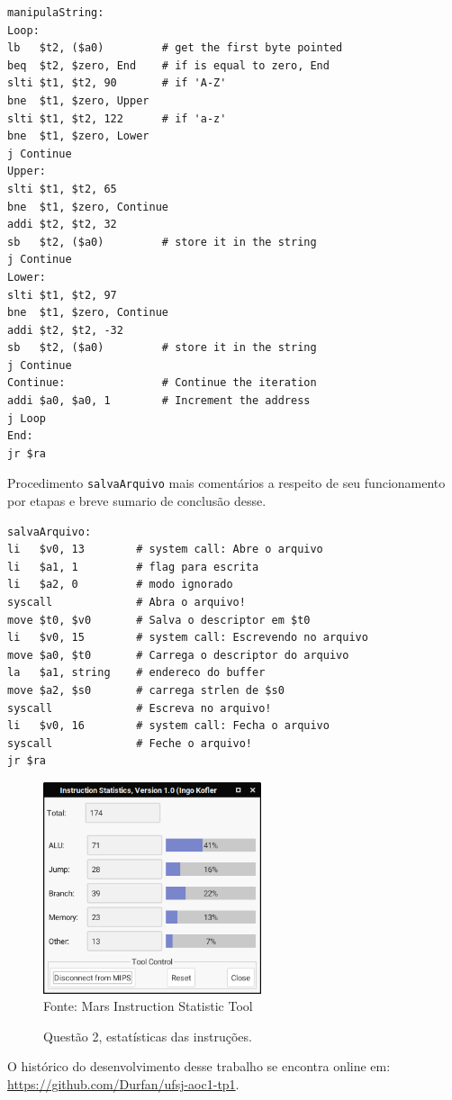 \documentclass[12pt,a4paper]{article}
\numberwithin{figure}{section}
\numberwithin{table}{section}
\begin{document}
\vspace{-0.5cm}
\begin{lstlisting}[caption={manipulaString}]
manipulaString:
Loop:  
lb   $t2, ($a0)         # get the first byte pointed
beq  $t2, $zero, End    # if is equal to zero, End
slti $t1, $t2, 90       # if 'A-Z'
bne  $t1, $zero, Upper
slti $t1, $t2, 122      # if 'a-z'
bne  $t1, $zero, Lower
j Continue
Upper:
slti $t1, $t2, 65
bne  $t1, $zero, Continue
addi $t2, $t2, 32  
sb   $t2, ($a0)         # store it in the string
j Continue
Lower:
slti $t1, $t2, 97
bne  $t1, $zero, Continue
addi $t2, $t2, -32  
sb   $t2, ($a0)         # store it in the string
j Continue
Continue:               # Continue the iteration
addi $a0, $a0, 1        # Increment the address
j Loop
End:    
jr $ra
\end{lstlisting}

Procedimento \texttt{salvaArquivo} mais comentários a respeito de seu funcionamento por etapas e breve sumario de conclusão desse.

\pagebreak

\vspace{-0.5cm}
\begin{lstlisting}[caption={salvaArquivo}]
salvaArquivo:
li   $v0, 13        # system call: Abre o arquivo
li   $a1, 1         # flag para escrita
li   $a2, 0         # modo ignorado
syscall             # Abra o arquivo!
move $t0, $v0       # Salva o descriptor em $t0 
li   $v0, 15        # system call: Escrevendo no arquivo
move $a0, $t0       # Carrega o descriptor do arquivo 
la   $a1, string    # endereco do buffer
move $a2, $s0       # carrega strlen de $s0
syscall             # Escreva no arquivo!
li   $v0, 16        # system call: Fecha o arquivo
syscall             # Feche o arquivo!
jr $ra
\end{lstlisting}

\lipsum[1]

\begin{figure}[H]
	\centering
	\caption{Questão 2, estatísticas das instruções.}
	\vspace{0.2cm}
	\includegraphics[width=242px]{questao2_stats}
	\\\footnotesize Fonte: Mars Instruction Statistic Tool
\end{figure}


\pagebreak

\begin{flushleft}
	\nocite{*}
	
	\vfill
	O histórico do desenvolvimento desse trabalho se encontra online em:\\ \url{https://github.com/Durfan/ufsj-aoc1-tp1}.
\end{flushleft}
\end{document}
